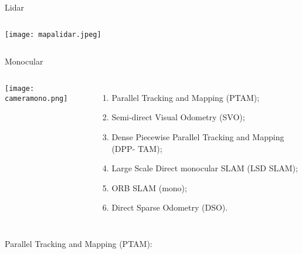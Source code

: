\begin{frame}[t]{Lidar}
    \transboxout[duration=0.5]
    \begin{columns}
            \texttt{[image: mapalidar.jpeg]}
    \end{columns}
\end{frame}
\begin{frame}[t]{Monocular}
    \transboxout[duration=0.5]
    \begin{columns}
            \texttt{[image: cameramono.png]}
            \begin{enumerate}
                \item Parallel Tracking and Mapping (PTAM);
                \item Semi-direct Visual Odometry (SVO);
                \item Dense Piecewise Parallel Tracking and Mapping (DPP-
                        TAM);
                \item Large Scale Direct monocular SLAM (LSD SLAM);
                \item ORB SLAM (mono);
                \item Direct Sparse Odometry (DSO).
            \end{enumerate}
    \end{columns}
\end{frame}
\begin{frame}[c]{Parallel Tracking and Mapping (PTAM):}
    \centering


\end{frame}
